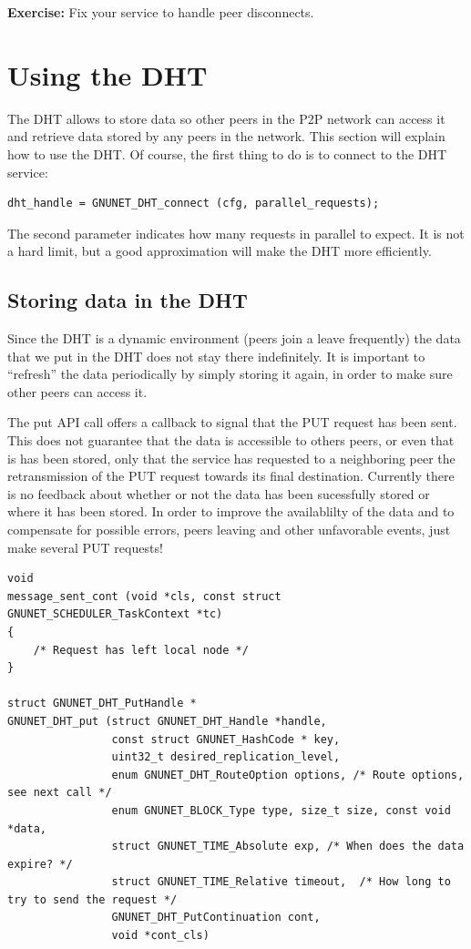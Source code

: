 \documentclass[10pt]{article}
\newcommand{\exercise}[1]{\noindent\begin{boxedminipage}{\textwidth}{\bf Exercise:} #1 \end{boxedminipage}}
\begin{document}
\exercise{Fix your service to handle peer disconnects.}

\section{Using the DHT}
The DHT allows to store data so other peers in the P2P network can
access it and retrieve data stored by any peers in the network.
This section will explain how to use the DHT. Of course, the first
thing to do is to connect to the DHT service:
\lstset{language=C}
\begin{lstlisting}
dht_handle = GNUNET_DHT_connect (cfg, parallel_requests);
\end{lstlisting}
The second parameter indicates how many requests in parallel to expect.
It is not a hard limit, but a good approximation will make the DHT more
efficiently.

\subsection{Storing data in the DHT}
Since the DHT is a dynamic environment (peers join a leave frequently)
the data that we put in the DHT does not stay there indefinitely. It is
important to ``refresh'' the data periodically by simply storing it again,
in order to make sure other peers can access it.

The put API call offers a callback to signal that the PUT request has been
sent. This does not guarantee that the data is accessible to others peers,
or even that is has been stored, only that the service has requested to
a neighboring peer the retransmission of the PUT request towards its final
destination. Currently there is no feedback about whether or not the data
has been sucessfully stored or where it has been stored. In order to improve
the availablilty of the data and to compensate for possible errors, peers leaving
and other unfavorable events, just make several PUT requests!

\lstset{language=C}
\begin{lstlisting}
void
message_sent_cont (void *cls, const struct GNUNET_SCHEDULER_TaskContext *tc)
{
    /* Request has left local node */
}

struct GNUNET_DHT_PutHandle *
GNUNET_DHT_put (struct GNUNET_DHT_Handle *handle, 
                const struct GNUNET_HashCode * key,
                uint32_t desired_replication_level,
                enum GNUNET_DHT_RouteOption options, /* Route options, see next call */
                enum GNUNET_BLOCK_Type type, size_t size, const void *data,
                struct GNUNET_TIME_Absolute exp, /* When does the data expire? */
                struct GNUNET_TIME_Relative timeout,  /* How long to try to send the request */
                GNUNET_DHT_PutContinuation cont,
                void *cont_cls)
\end{lstlisting}
\end{document}
